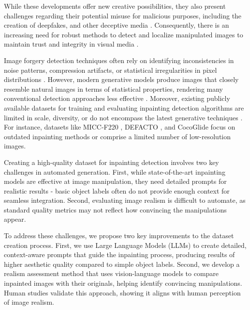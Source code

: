 While these developments offer new creative possibilities, they also present challenges regarding their potential misuse for malicious purposes, including the creation of deepfakes, and other deceptive media \cite{verdoliva2020media, wu2022defakehop}. Consequently, there is an increasing need for robust methods to detect and localize manipulated images to maintain trust and integrity in visual media \cite{zhou2018learning, wang2020cnn}.

Image forgery detection techniques often rely on identifying inconsistencies in noise patterns, compression artifacts, or statistical irregularities in pixel distributions \cite{bayar2016bayarfilter, zhou2018learning}. However, modern generative models produce images that closely resemble natural images in terms of statistical properties, rendering many conventional detection approaches less effective \cite{frank2020leveraging}. Moreover, existing publicly available datasets for training and evaluating inpainting detection algorithms are limited in scale, diversity, or do not encompass the latest generative techniques \cite{novozamsky2020imd2020, guillaro2023trufor, mareen2024tgif}. For instance, datasets like MICC-F220 \cite{amerini2011micc}, DEFACTO \cite{mahfoudi2019defacto}, and CocoGlide \cite{guillaro2023trufor} focus on outdated inpainting methods or comprise a limited number of low-resolution images.


Creating a high-quality dataset for inpainting detection involves two key challenges in automated generation. First, while state-of-the-art inpainting models are effective at image manipulation, they need detailed prompts for realistic results \cite{mahajan2023promptinghardhardlyprompting} - basic object labels often do not provide enough context for seamless integration. Second, evaluating image realism is difficult to automate, as standard quality metrics may not reflect how convincing the manipulations appear.

To address these challenges, we propose two key improvements to the dataset creation process. First, we use Large Language Models (LLMs) to create detailed, context-aware prompts that guide the inpainting process, producing results of higher aesthetic quality compared to simple object labels. Second, we develop a realism assessment method that uses vision-language models to compare inpainted images with their originals, helping identify convincing manipulations. Human studies validate this approach, showing it aligns with human perception of image realism.

